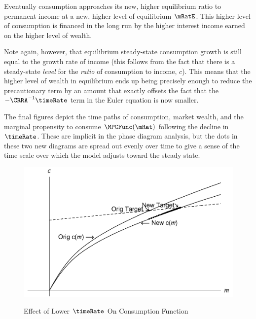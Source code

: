 \documentclass{handout}
\begin{document}
Eventually consumption approaches its new, higher equilibrium ratio
to permanent income at a new, higher level of equilibrium $\mRatE$.  This
higher level of consumption is financed in the long run by the higher
interest income earned on the higher level of wealth.

Note again, however, that equilibrium steady-state 
consumption growth is still equal to the growth rate of income (this follows
from the fact that there is a steady-state {\it level} for the {\it
  ratio} of consumption to income, $c$).  This means that the higher
level of wealth in equilibrium ends up being precisely enough to
reduce the precautionary term by an amount that exactly offsets the
fact that the $-\CRRA^{-1}\timeRate$ term in the Euler equation is now
smaller.

The final figures depict the time paths of consumption, market wealth,
and the marginal propensity to consume $\MPCFunc(\mRat)$ following the
decline in $\timeRate$.  These are implicit in the phase diagram
analysis, but the dots in these two new diagrams are spread out evenly
over time to give a sense of the time scale over which the model
adjusts toward the steady state.

\begin{figure}
\caption{Effect of Lower $\timeRate$ On Consumption Function}
\includegraphics[width=6in]{../Figures/PhaseDiagramDecreaseThetaPlot}
\label{fig:DecreaseTheta}
\end{figure}
\end{document}
